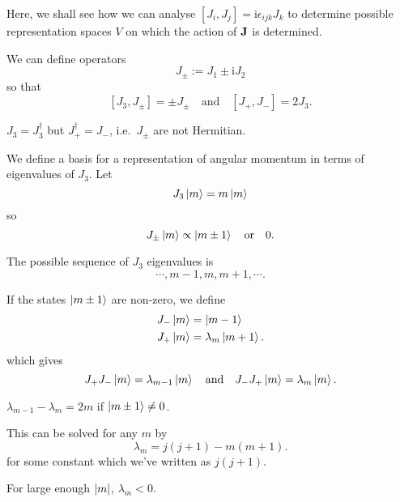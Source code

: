 \documentclass[a4paper,11pt]{article}
\begin{document}
	Here, we shall see how we can analyse $[J_i , J_j] = \mathrm{i} \epsilon _{ijk} J_k$ to determine possible representation spaces $V$ on which the action of $\vb J$ is determined.
	
	We can define operators
	\[
		J _{\pm} := J_1 \pm \mathrm{i} J_2
	\]
	so that
	\[
		[J_3,J_\pm] = \pm J_\pm \quad \text{and} \quad [J_+, J_-] = 2J_3.
	\]
	\begin{nt}
		$J_3 = J_3^\dagger$ but $J_+^\dagger = J_-$, i.e.\ $J_\pm$ are not Hermitian.
	\end{nt}
	 
	We define a basis for a representation of angular momentum in terms of eigenvalues of $J_3$. Let 
	\[
		J_3 \ket{m} = m \ket{m}
	\]
	so
	\[
		J_\pm \ket{m} \propto \ket{m\pm 1} \quad \text{or}\quad 0.
	\]
	
	The possible sequence of $J_3$ eigenvalues is
	\[
		\cdots, m-1, m, m+1, \cdots.
	\]
	
	If the states $\ket{m\pm 1}$ are non-zero, we define
	\begin{align*}
		J_- \ket{m} & = \ket{m-1}\\
		J_+ \ket{m} & = \lambda_m \ket{m+1}.
	\end{align*}
	which gives
	\[
		J_+ J_- \ket{m} = \lambda _{m-1} \ket{m} \quad \text{and} \quad J_- J_+ \ket{m} = \lambda_m \ket{m}.
	\]
	
	$\lambda _{m-1} - \lambda_m = 2m$ if $\ket{m \pm 1} \neq 0$.

	This can be solved for any $m$ by 
	\begin{equation}
		\lambda_m = j(j+1) - m(m+1).
		\label{eq:3.4.1}
	\end{equation}
	for some constant which we've written as $j(j+1)$.

	For large enough $\abs{m}$, $\lambda_m < 0$.
\end{document}
